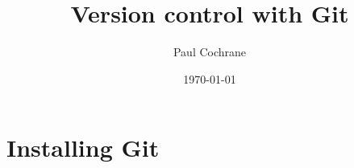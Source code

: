\documentclass{git_course}
\title{Version control with Git}
\author{Paul Cochrane}
\date{\today}
\begin{document}
\maketitle

\begin{frame}
\begin{multicols}{2}
\begin{spacing}{0.8}
\tableofcontents
\end{spacing}
\end{multicols}
\end{frame}





\section{Installing Git}
\end{document}
